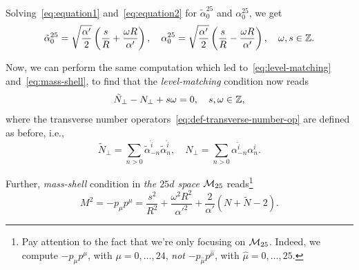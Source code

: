 Solving~\eqref{eq:equation1} and~\eqref{eq:equation2} for $\tilde{\alpha}^{25}_0$ and ${\alpha}^{25}_0$, we get
\begin{equation}
    \tilde{\alpha}^{25}_0 = \sqrt{\frac{\alpha'}{2}} \left( \frac{s}{R} + \frac{\omega R}{\alpha'} \right), \quad {\alpha}^{25}_0 = \sqrt{\frac{\alpha'}{2}} \left( \frac{s}{R} - \frac{\omega R}{\alpha'} \right), \quad \omega, s \in \mathbb{Z}.
\end{equation}

Now, we can perform the same computation which led to~\eqref{eq:level-matching} and~\eqref{eq:mass-shell}, to find that the \emph{level-matching} condition now reads
\begin{equation}\label{eq:comp-level-matrching}
    \tilde{N}_\perp - N_\perp + s \omega = 0, \quad s,\omega \in \mathbb{Z},
\end{equation}
where the transverse number operators~\eqref{eq:def-transverse-number-op} are defined as before, i.e.,
\begin{equation}\label{eq:equation3}
    \tilde{N}_\perp = \sum_{n> 0} \tilde{\alpha}^{\hat{i}}_{-n}\tilde{\alpha}^{\hat{i}}_n, \quad N_\perp = \sum_{n>  0} \alpha^{\hat{i}}_{-n}\alpha^{\hat{i}}_n.
\end{equation}

Further, \emph{mass-shell} condition in \emph{the $25d$ space $\mathcal{M}_{25}$} reads\footnote{Pay attention to the fact that we're only focusing on $\mathcal{M}_{25}$. Indeed, we compute $-p_\mu p^\mu$, with $\mu = 0, \dots, 24$, \emph{not} $-p_{\hat{\mu}}p^{\hat{\mu}}$, with $\hat{\mu} = 0, \dots, 25$.}
\begin{equation}\label{eq:comp-mass-shell}
    M^2 = - p_\mu p^\mu = \frac{s^2}{R^2} + \frac{\omega^2 R^2}{\alpha'^2} + \frac{2}{\alpha'} (N + \tilde{N} - 2) .
\end{equation}

